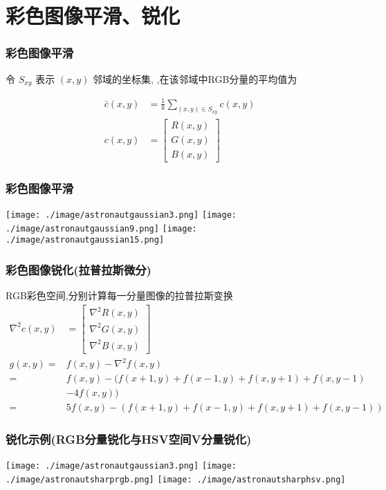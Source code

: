\documentclass{beamer}
\begin{document}
\section{彩色图像平滑、锐化}
\label{sec-6}
\begin{frame}
\frametitle{彩色图像平滑}
\label{sec-6-1}

令 $S_{xy}$ 表示 $(x,y)$ 邻域的坐标集, ,在该邻域中RGB分量的平均值为

\begin{align*}
\bar c(x,y) &=\frac{1}{k}\sum_{(x,y)\in S_{xy}}c(x,y) \\
 c(x,y) &=
\begin{bmatrix}
R(x,y)\\
G(x,y)\\
B(x,y)
\end{bmatrix}
\end{align*}
\end{frame}
\begin{frame}
\frametitle{彩色图像平滑}
\label{sec-6-2}

\texttt{[image: ./image/astronautgaussian3.png]}
\texttt{[image: ./image/astronautgaussian9.png]}
\texttt{[image: ./image/astronautgaussian15.png]}
\end{frame}
\begin{frame}
\frametitle{彩色图像锐化(拉普拉斯微分)}
\label{sec-6-3}

RGB彩色空间,分别计算每一分量图像的拉普拉斯变换
\begin{align*}
\nabla^2c(x,y) &=
\begin{bmatrix}
\nabla^2 R(x,y)\\
\nabla^2 G(x,y)\\
\nabla^2 B(x,y)
\end{bmatrix}\\
g(x,y) ={} & f(x,y)-\nabla^2 f(x,y) \\
 = {} & f(x,y)-(f(x+1,y)+f(x-1,y)+f(x,y+1)+f(x,y-1) \\
  & - 4f(x,y)) \\
={} & 5f(x,y)-(f(x+1,y)+f(x-1,y)+f(x,y+1)+f(x,y-1))
\end{align*}
\end{frame}
\begin{frame}
\frametitle{锐化示例(RGB分量锐化与HSV空间V分量锐化)}
\label{sec-6-4}

\texttt{[image: ./image/astronautgaussian3.png]}
\texttt{[image: ./image/astronautsharprgb.png]}
\texttt{[image: ./image/astronautsharphsv.png]}
\end{frame}
\end{document}
